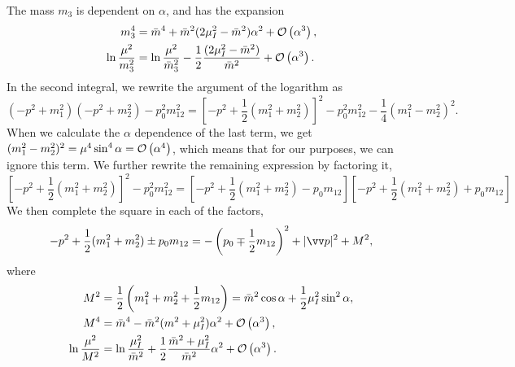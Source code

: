 The mass $m_3$ is dependent on $\alpha$, and has the expansion
\begin{align*}
    m_3^4
    &= \bar m^4 + \bar m^2(2\mu_I^2 - \bar m^2)\alpha^2+ \Oh[3]{\alpha}, \\
    \ln \frac{\mu^2}{m_3^2}
    &=
    \ln \frac{\mu^2}{\bar m_3^2} - \frac{1}{2} \frac{(2\mu_I^2 - \bar m^2)}{\bar m^2}+ \Oh[3]{\alpha}.
\end{align*}
In the second integral, we rewrite the argument of the logarithm as
\begin{equation}
    (-p^2 + m_1^2)(-p^2 + m_2^2) - p_0^2 m_{12}^2
    =  \left[-p^2 + \frac{1}{2}(m_1^2 + m_2^2)\right]^2 - p_0^2 m_{12}^2 - \frac{1}{4}(m_1^2 - m_2^2)^2.
\end{equation}
When we calculate the $\alpha$ dependence of the last term, we get  $(m_1^2 - m_2^2)^2 = \mu^4 \sin^4\alpha = \Oh[4]{\alpha}$, which means that for our purposes, we can ignore this term.
We further rewrite the remaining expression by factoring it,
\begin{equation}
    \left[-p^2 + \frac{1}{2}(m_1^2 + m_2^2)\right]^2 - p_0^2 m_{12}^2
    = \left[-p^2 + \frac{1}{2}(m_1^2 + m_2^2) - p_0 m_{12} \right]
    \left[-p^2 + \frac{1}{2}(m_1^2 + m_2^2) + p_0 m_{12} \right]
\end{equation}
We then complete the square in each of the factors,
\begin{equation}
    - p^2 + \frac{1}{2}(m_1^2 + m_2^2) \pm p_0 m_{12}
    = - \left(p_0 \mp \frac{1}{2}m_{12}\right)^2 + |\vv p|^2 + M^2,
\end{equation}
where
\begin{align}
    M^2 &= \frac{1}{2}\left(m_1^2 +m_2^2 +\frac{1}{2}m_{12}\right)
    = \bar m^2 \cos\alpha + \frac{1}{2} \mu_I^2 \sin^2 \alpha, \\
    M^4
    &= \bar m^4 - \bar m^2(m^2 + \mu_I^2) \alpha^2 + \Oh[3]{\alpha}, \\
    \ln \frac{\mu^2}{M^2} 
    &= \ln \frac{\mu_I^2}{\bar m^2} + \frac{1}{2}\frac{\bar m^2 + \mu_I^2}{\bar m^2}\alpha^2
    + \Oh[3]{\alpha}.
\end{align}
